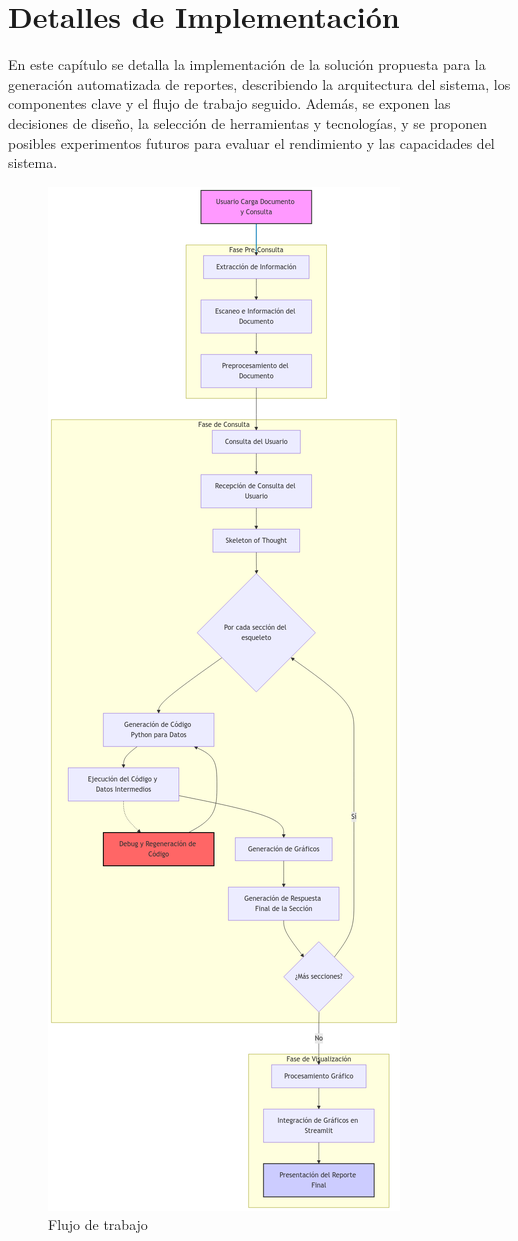 \section{Detalles de Implementación}\label{chapter:implementation}

En este capítulo se detalla la implementación de la solución propuesta para la generación automatizada de reportes, describiendo la arquitectura del sistema, los componentes clave y el flujo de trabajo seguido.  Además, se exponen las decisiones de diseño, la selección de herramientas y tecnologías, y se proponen posibles experimentos futuros para evaluar el rendimiento y las capacidades del sistema.

\begin{figure}
	\centering
	\includegraphics[height=\textheight]{Graphics/graph.png}
	\caption{Flujo de trabajo}
\end{figure}

